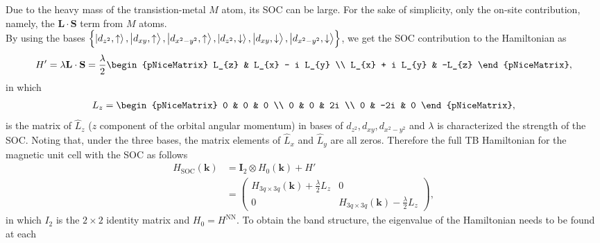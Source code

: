 \documentclass{report}
\newcommand{\f}[2]{\dfrac{#1}{#2}}
\begin{document}
Due to the heavy mass of the transistion-metal $M$ atom, its \ac{SOC} can be large. For the sake of simplicity, only the on-site contribution, namely, the $\mathbf{L \cdot S}$ term from $M$ atoms.\\ By using the bases $\left\{\ket{d_{z^{2}},\uparrow},\ket{d_{xy},\uparrow},\ket{d_{x^{2} - y^{2}},\uparrow},\ket{d_{z^{2}},\downarrow},\ket{d_{xy},\downarrow},\ket{d_{x^{2} - y^{2} },\downarrow}\right\}$, we get the SOC contribution to the Hamiltonian as
\begin{gather}
	H{'}
	= \lambda \mathbf{L \cdot S}
	= \f{\lambda}{2}
	\begin{pNiceMatrix}
		L_{z}           & L_{x} - i L_{y} \\
		L_{x} + i L_{y} & -L_{z}
	\end{pNiceMatrix},
\end{gather}
in which
\begin{gather}
	L_{z}
	=
	\begin{pNiceMatrix}
		0 & 0   & 0  \\
		0 & 0   & 2i \\
		0 & -2i & 0
	\end{pNiceMatrix},
\end{gather}
is the matrix of $\hat{L}_{z}$ ($z$ component of the orbital angular momentum) in bases of $d_{z^{2}},d_{xy},d_{x^{2} - y^{2}}$ and $\lambda$ is characterized the strength of the SOC. Noting that, under the three bases, the matrix elements of $\hat{L}_{x}$ and $\hat{L}_{y}$ are all zeros. Therefore the full TB Hamiltonian for the magnetic unit cell with the SOC as follows
\begin{equation}
	\begin{aligned}
		H_{\text{SOC}}(\mathbf{k})
		 & = \mathbf{I}_{2} \otimes H_{0}(\mathbf{k}) + H{'} \\
		 & =
		\begin{pmatrix}
			H_{3q \times 3q}(\mathbf{k}) + \frac{\lambda}{2} L_{z} & 0                                                      \\
			0                                                      & H_{3q \times 3q}(\mathbf{k}) - \frac{\lambda}{2} L_{z}
		\end{pmatrix},
	\end{aligned}
\end{equation}
in which $I_{2}$ is the $2\times 2$ identity matrix and $H_{0} = H^{\text{NN}}$. To obtain the band structure, the eigenvalue of the Hamiltonian needs to be found at each
\end{document}
